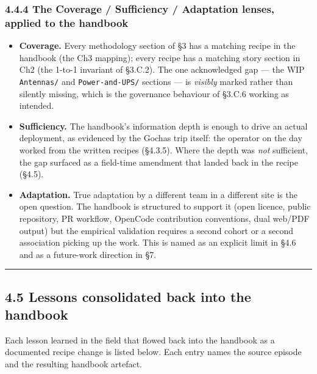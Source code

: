 \hypertarget{the-coverage-sufficiency-adaptation-lenses-applied-to-the-handbook}{%
\subsubsection{4.4.4 The Coverage / Sufficiency / Adaptation lenses,
applied to the
handbook}\label{the-coverage-sufficiency-adaptation-lenses-applied-to-the-handbook}}

\begin{itemize}
\tightlist
\item
  \textbf{Coverage.} Every methodology section of §3 has a matching
  recipe in the handbook (the Ch3 mapping); every recipe has a matching
  story section in Ch2 (the 1-to-1 invariant of §3.C.2). The one
  acknowledged gap --- the WIP \texttt{Antennas/} and
  \texttt{Power-and-UPS/} sections --- is \emph{visibly} marked rather
  than silently missing, which is the governance behaviour of §3.C.6
  working as intended.
\item
  \textbf{Sufficiency.} The handbook's information depth is enough to
  drive an actual deployment, as evidenced by the Gochas trip itself:
  the operator on the day worked from the written recipes (§4.3.5).
  Where the depth was \emph{not} sufficient, the gap surfaced as a
  field-time amendment that landed back in the recipe (§4.5).
\item
  \textbf{Adaptation.} True adaptation by a different team in a
  different site is the open question. The handbook is structured to
  support it (open licence, public repository, PR workflow, OpenCode
  contribution conventions, dual web/PDF output) but the empirical
  validation requires a second cohort or a second association picking up
  the work. This is named as an explicit limit in §4.6 and as a
  future-work direction in §7.
\end{itemize}

\begin{center}\rule{0.5\linewidth}{0.5pt}\end{center}

\hypertarget{lessons-consolidated-back-into-the-handbook}{%
\subsection{4.5 Lessons consolidated back into the
handbook}\label{lessons-consolidated-back-into-the-handbook}}

Each lesson learned in the field that flowed back into the handbook as a
documented recipe change is listed below. Each entry names the source
episode and the resulting handbook artefact.

